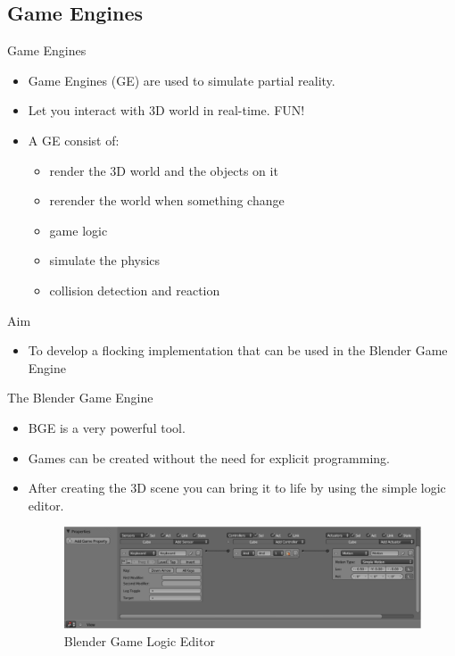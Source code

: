 \documentclass[red]{beamer}
\begin{document}
\subsection{Game Engines}
\begin{frame}{Game Engines}
	\begin{itemize}
		\pause \item Game Engines (GE) are used to simulate partial reality.
		\pause \item Let you interact with 3D world in real-time. \pause FUN!
		\pause \item A GE consist of:
			\begin{itemize}
				\pause \item render the 3D world and the objects on it
				\pause \item rerender the world when something change
				\pause \item game logic
				\pause \item simulate the physics
				\pause \item collision detection and reaction
			\end{itemize}
	\end{itemize}
\end{frame}

\begin{frame}{Aim}
	\begin{itemize}
		\pause \item To develop a flocking implementation that can be used in the Blender Game Engine
	\end{itemize}
\end{frame}

\begin{frame}{The Blender Game Engine}
	\begin{itemize}
		\pause \item BGE is a very powerful tool.
		\pause \item Games can be created without the need for explicit programming.
		\pause \item After creating the 3D scene you can bring it to life by using the simple logic editor.
			\pause
			\begin{figure}[htbp]
			\begin{center}
			\includegraphics[scale=0.25]{../figures/logic.pdf}
			\caption{Blender Game Logic Editor}
			\label{logicEditor}
			\end{center}
			\end{figure}
	\end{itemize}
\end{frame}
\end{document}
